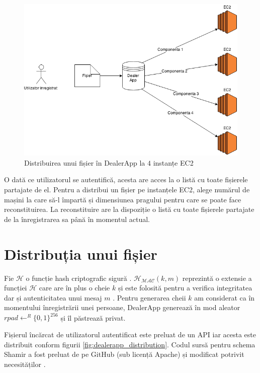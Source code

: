 \documentclass[oneside, 12pt]{book}
\begin{document}
\begin{figure}
	\begin{center}
	\includegraphics[width=1\textwidth]{img/DealerApp.png}
	\caption{Distribuirea unui fișier în DealerApp la $4$ instanțe EC2}
	\label{fig:dealerapp}
	\end{center}
	\bigskip
\end{figure}


O dată ce utilizatorul se autentifică, acesta are acces la o listă cu toate fișierele partajate de el. Pentru a distribui un fișier pe instanțele EC2, alege numărul de mașini la care să-l împartă și dimensiunea pragului pentru care se poate face reconstituirea. La reconstituire are la dispoziție o listă cu toate fișierele partajate de la înregistrarea sa până în momentul actual.


\section{Distribuția unui fișier}

Fie $\mathcal{H}$ o funcție hash criptografic sigură \cite{Katz:2007}. $\mathcal{H_{MAC}}(k, m)$ reprezintă o extensie a funcției $\mathcal{H}$ care are în plus o cheie $k$ și este folosită pentru a verifica integritatea dar și autenticitatea unui mesaj $m$ \cite{krawczyk1997hmac}. Pentru generarea cheii $k$ am considerat ca în momentului înregistrării unei persoane, DealerApp generează în mod aleator $rpad \leftarrow^R \{0,1\}^{256}$ și îl păstrează privat.

Fișierul încărcat de utilizatorul autentificat este preluat de un API iar acesta este distribuit conform figurii \ref{fig:dealerapp_distribution}. Codul sursă pentru schema Shamir a fost preluat de pe GitHub (sub licență Apache) și modificat potrivit necesităților \cite{website:pysss-github}.
\end{document}
